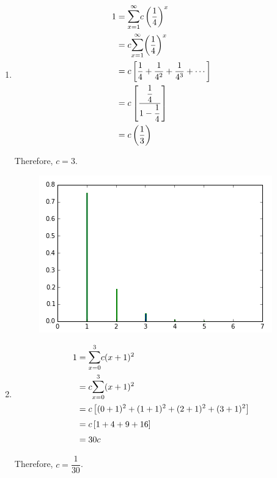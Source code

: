\documentclass{article}
\begin{document}
\begin{enumerate}
\begin{enumerate}
	\item 
	  \begin{align*}
	    1 &= \mathlarger{\sum}_{x=1}^\infty{c\left(\dfrac{1}{4}\right)^x} \\
	      &= c \mathlarger{\sum}_{x=1}^\infty{\left(\dfrac{1}{4}\right)^x} \\
	      &= c \left[ \dfrac{1}{4} + \dfrac{1}{4^2} + \dfrac{1}{4^3} + \cdots \right] \\
	      &= c \left[\dfrac{\dfrac{1}{4}}{1 - \dfrac{1}{4}}\right] \\
	      &= c \left( \dfrac{1}{3} \right)
	  \end{align*}
	  
	  Therefore, $c = 3$.
	  
	  \begin{figure}[h!]
	    \centering
	    \includegraphics[scale=.6]{./images/3c_pmf-line_graph.png}
	  \end{figure}
	  
	\item
	  \begin{align*}
	    1 &= \mathlarger{\sum}_{x = 0}^3{c(x+1)^2} \\
	      &= c \mathlarger{\sum}_{x = 0}^3{(x+1)^2} \\
	      &= c \left[ (0+1)^2 + (1+1)^2 + (2+1)^2 + (3+1)^2 \right] \\
	      &= c \left[ 1 + 4 + 9 + 16 \right] \\
	      &= 30c
	  \end{align*}
	  
	  Therefore, $c = \dfrac{1}{30}$.
	  

\end{enumerate}
\end{enumerate}
\end{document}
